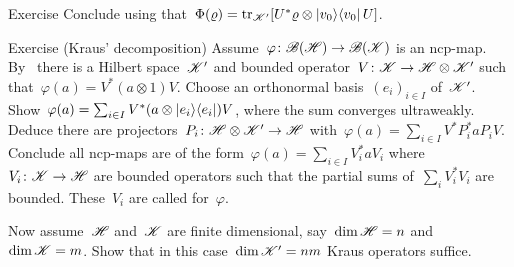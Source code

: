 \documentclass[b]{subfiles}
\begin{document}
\begin{parsec}
\begin{point}{Exercise}
Conclude using 
that~$\Phi(\varrho) = \mathop{\mathrm{tr}}_{\mathscr{K}'} [U^* \varrho \otimes \left|v_0\right>\!\left<v_0\right| U]$.
\end{point}
\begin{point}{Exercise (Kraus' decomposition)}%
Assume~$\varphi \colon \mathscr{B}(\mathscr{H}) \to \mathscr{B}(\mathscr{K})$
    is an ncp-map.
By~
    there is a Hilbert space~$\mathscr{K}'$
    and bounded operator~$V\colon \mathscr{K} \to \mathscr{H} \otimes \mathscr{K}'$
    such that~$\varphi(a) = V^* (a \otimes 1) V$.
Choose an orthonormal basis~$(e_i)_{i \in I}$ of~$\mathscr{K}'$.
Show~$\varphi(a) = \sum_{i \in I} V^* (a \otimes \left|e_i\right>\!\left<e_i\right|) V$,
where the sum converges ultraweakly.
Deduce there are projectors~$P_i \colon \mathscr{H} \otimes \mathscr{K}' \to \mathscr{H}$
with~$\varphi(a) = \sum_{i \in I} V^*P_i^* a P_iV$.
Conclude all ncp-maps
are of the form~$\varphi(a) = \sum_{i \in I} V_i^* a V_i$
where~$V_i\colon \mathscr{K} \to \mathscr{H}$ are bounded operators
such that the partial sums of~$\sum_i V_i^*V_i$ are bounded.
These~$V_i$ are called  for~$\varphi$.

Now assume~$\mathscr{H}$ and~$\mathscr{K}$ are finite dimensional,
    say~$\dim \mathscr{H} = n$ and~$\dim \mathscr{K} = m$.
Show that in this case~$\dim \mathscr{K}' = nm$ Kraus operators suffice.
\end{point}
\end{parsec}
\end{document}
